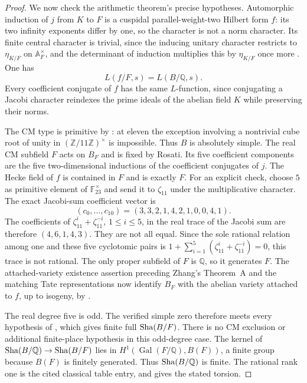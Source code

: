 \begin{proof}
We now check the arithmetic theorem's precise hypotheses.
Automorphic induction of $j$ from $K$ to $F$ is a cuspidal
parallel-weight-two Hilbert form $f$: its two infinity exponents
differ by one, so the character is not a norm character.  Its finite
central character is trivial, since the inducing unitary character
restricts to $\eta_{K/F}$ on $\mathbb A_F^\times$, and the determinant
of induction multiplies this by $\eta_{K/F}$ once more
\citep[\S3.4, author p.~15]{ShuExpanded2021}.  One has
\[
 L(f/F,s)=L(B/\mathbb Q,s).
\]
Every coefficient conjugate of $f$ has the same $L$-function, since
conjugating a Jacobi character reindexes the prime ideals of the
abelian field $K$ while preserving their norms.

The CM type is primitive by
\citet[Lemma~1.6, pp.~205--207]{GrossRohrlich1978}: at eleven the
exception involving a nontrivial cube root of unity in
$(\mathbb Z/11\mathbb Z)^\times$ is impossible.  Thus $B$ is
absolutely simple.  The real CM subfield $F$ acts on $B_F$ and is
fixed by Rosati.  Its five coefficient components are the five
two-dimensional inductions of the coefficient conjugates of $j$.
The Hecke field of $f$ is contained in $F$ and is exactly $F$.
For an explicit check, choose $5$ as primitive element of
$\mathbb F_{23}^{\times}$ and send it to $\zeta_{11}$ under the
multiplicative character.  The exact Jacobi-sum coefficient vector is
\[
 (c_0,\ldots,c_{10})=(3,3,2,1,4,2,1,0,0,4,1).
\]
The coefficients of $\zeta_{11}^i+\zeta_{11}^{-i}$, $1\le i\le5$,
in the real trace of the Jacobi sum are therefore
$(4,6,1,4,3)$.  They are not all equal.  Since the sole rational
relation among one and these five cyclotomic pairs is
$1+\sum_{i=1}^5(\zeta_{11}^i+\zeta_{11}^{-i})=0$, this trace is
not rational.  The only proper subfield of $F$ is $\mathbb Q$,
so it generates $F$.  The attached-variety existence assertion
preceding Zhang's Theorem~A and the matching Tate representations
now identify $B_F$ with the abelian variety attached to $f$, up to
isogeny, by \citet[\S5, Corollary~2, p.~22]{Faltings1986}.

The real degree five is odd.  The verified simple zero therefore
meets every hypothesis of \citet[Theorem~A, p.~28; proof in
\S7.2, p.~143]{Zhang2001}, which gives finite full $\operatorname{Sha}(B/F)$.
There is no CM exclusion or additional finite-place hypothesis in
this odd-degree case.  The kernel of
$\operatorname{Sha}(B/\mathbb Q)\to\operatorname{Sha}(B/F)$ lies in
$H^1(\operatorname{Gal}(F/\mathbb Q),B(F))$, a finite group because
$B(F)$ is finitely generated.  Thus $\operatorname{Sha}(B/\mathbb Q)$ is finite.
The rational rank one is the cited classical table entry, and
\citet[Theorem~1.1, p.~202]{GrossRohrlich1978} gives the stated torsion.
\end{proof}

